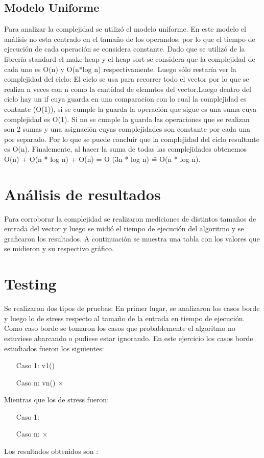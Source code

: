 \documentclass[a4paper, 12pt] {article}
\begin{document}
\subsection*{Modelo Uniforme}
Para analizar la complejidad se utiliz\'o el modelo uniforme. En este modelo el an\'alisis no esta centrado en el tama\~{n}o de los operandos, por lo que el tiempo de ejecuci\'on de cada operaci\'on se considera constante.
Dado que se utiliz\'o de la librer\'ia standard el make heap y el heap sort se considera que la complejidad de cada uno es O(n) y O(n*log n) respectivamente.
Luego s\'olo restar\'ia ver la complejidad del ciclo:
El ciclo se usa para recorrer todo el vector por lo que se realiza n veces con n como la cantidad de elemntos del vector.Luego dentro del ciclo hay un if cuya guarda en una comparacion con lo cual la complejidad es contante (O(1)), si se cumple la guarda la operaci\'on que sigue es una suma cuya complejidad es O(1). Si no se cumple la guarda las operaciones que se realizan son 2 sumas y una asignaci\'on cuyas complejidades son constante por cada una por separado. Por lo que se puede concluir que la complejidad del ciclo resultante es O(n).
Finalemente, al hacer la suma de todas las complejidades obtenemos O(n) + O(n * log n) + O(n) = O (3n * log n) \~{=} O(n * log n).
\section*{An\'alisis de resultados}
Para corroborar la complejidad se realizaron mediciones de distintos tama\~{n}os de entrada del vector y luego se midi\'o el tiempo de ejecuci\'on del algoritmo y se graficaron los resultados.
A continuaci\'on se muestra una tabla con los valores que se midieron y su respectivo gr\'afico.
\section*{Testing}
Se realizaron dos tipos de pruebas: En primer lugar, se analizaron los casos borde y luego lo de stress respecto al tama\~{n}o de la entrada en tiempo de ejecuci\'on.
Como caso borde se tomaron los casos que probablemente el algoritmo no estuviese abarcando o pudiese estar ignorando.
En este ejercicio los casos borde estudiados fueron los siguientes:
\begin{itemize}
  \item[Caso 1:] v1()
  \item[Caso n:] vn()
 ×
\end{itemize}

Mientras que los de stress fueron:
\begin{itemize}
  \item[Caso 1:]
  \item[Caso n:]
 ×
\end{itemize}
Los resultados obtenidos son :
\end{document}

